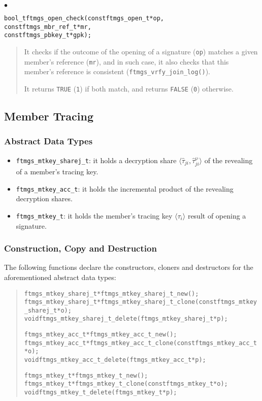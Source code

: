 \documentclass[a4paper]{article}
\newenvironment{code}%
{\begin{quote}\footnotesize\begin{alltt}}%
{\end{alltt}\end{quote}}%
\newenvironment{api}%
{\noindent$\bullet$\hfill\begin{minipage}[t]{0.97\linewidth}\footnotesize\begin{alltt}}%
{\end{alltt}\end{minipage}}%
\newcommand{\tuple}[1]{\ensuremath{\langle #1 \rangle}}
\begin{document}
\begin{api}
bool_t ftmgs_open_check(const ftmgs_open_t* op,
                        const ftmgs_mbr_ref_t* mr,
                        const ftmgs_pbkey_t* gpk);
\end{api}
\begin{quote}\footnotesize
It checks if the outcome of the opening of a signature (\verb|op|)
matches a given member's reference (\verb|mr|), and in such case, it
also checks that this member's reference is consistent
(\verb|ftmgs_vrfy_join_log()|).

It returns \verb|TRUE| (\verb|1|) if both match, and returns
\verb|FALSE| (\verb|0|) otherwise.
\end{quote}

\subsection{Member Tracing}

\subsubsection*{Abstract Data Types}
\begin{itemize}\small
\item \verb|ftmgs_mtkey_sharej_t|: it holds a decryption share
  \tuple{\hat{\tau}_{ji},\hat{\tau}^{\wp}_{ji}} of the
  revealing of a member's tracing key.
\item \verb|ftmgs_mtkey_acc_t|: it holds the incremental product of the
  revealing decryption shares.
\item \verb|ftmgs_mtkey_t|: it holds the member's tracing key
  \tuple{\tau_{i}} result of opening a signature.
\end{itemize}
\subsubsection*{Construction, Copy and Destruction}
The following functions declare the constructors, cloners and destructors
for the aforementioned abstract data types:
\begin{code}
ftmgs_mtkey_sharej_t* ftmgs_mtkey_sharej_t_new();
ftmgs_mtkey_sharej_t* ftmgs_mtkey_sharej_t_clone(const ftmgs_mtkey_sharej_t* o);
void ftmgs_mtkey_sharej_t_delete(ftmgs_mtkey_sharej_t* p);

ftmgs_mtkey_acc_t* ftmgs_mtkey_acc_t_new();
ftmgs_mtkey_acc_t* ftmgs_mtkey_acc_t_clone(const ftmgs_mtkey_acc_t* o);
void ftmgs_mtkey_acc_t_delete(ftmgs_mtkey_acc_t* p);

ftmgs_mtkey_t* ftmgs_mtkey_t_new();
ftmgs_mtkey_t* ftmgs_mtkey_t_clone(const ftmgs_mtkey_t* o);
void ftmgs_mtkey_t_delete(ftmgs_mtkey_t* p);
\end{code}
\end{document}
